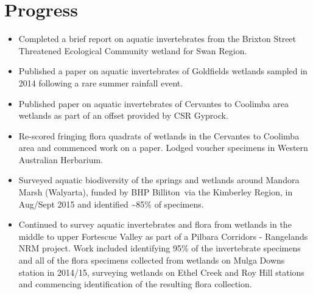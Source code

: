 \documentclass[version=last,
    paper=a4, %
    10pt, %
    usenames,
    dvipsnames,
    oneside, %
    headings=openany, %
    DIV=15 %
]{scrbook}
\begin{document}
\section*{Progress}
\begin{itemize}
\itemsep1pt\parskip0pt
\item
  Completed a brief report on aquatic invertebrates from the Brixton
  Street Threatened Ecological Community wetland for Swan Region.
\item
  Published a paper on aquatic invertebrates of Goldfields wetlands
  sampled in 2014 following a rare summer rainfall event.
\item
  Published paper on aquatic invertebrates of Cervantes to Coolimba area
  wetlands as part of an offset provided by CSR Gyprock.
\item
  Re-scored fringing flora quadrats of wetlands in the Cervantes to
  Coolimba area and commenced work on a paper. Lodged voucher specimens
  in Western Australian Herbarium.
\item
  Surveyed aquatic biodiversity of the springs and wetlands around
  Mandora Marsh (Walyarta), funded by BHP Billiton~via the Kimberley
  Region, in Aug/Sept 2015 and identified \textasciitilde{}85\% of
  specimens.
\item
  Continued to survey aquatic invertebrates and flora from wetlands in
  the middle to upper Fortescue Valley as part of a Pilbara Corridors -
  Rangelands NRM project. Work included identifying 95\% of the
  invertebrate specimens and all of the flora specimens collected from
  wetlands on Mulga Downs station in 2014/15, surveying wetlands on
  Ethel Creek and Roy Hill stations and commencing identification of the
  resulting flora collection.
\end{itemize}
\end{document}
